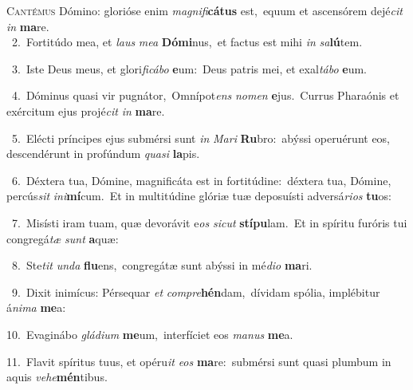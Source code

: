 \lettrine{\initial\textcolor{\initialcolor}{C}}{antémus} Dómino: glorióse enim \textit{ma}\-\textit{gni}\textit{fi}\textbf{cá}\textbf{tus} est,~\star equum et ascensórem dejé\textit{cit} \textit{in} \textbf{ma}\-re.\\
{\numbfont\textcolor{\numbcolor}{~2.}}~Fortitúdo mea, et \textit{laus} \textit{me}\-\textit{a} \textbf{Dó}\-\textbf{mi}nus,~\star et factus est mihi \textit{in} \textit{sa}\-\textbf{lú}tem.\par
{\numbfont\textcolor{\numbcolor}{~3.}}~Iste Deus meus, et glori\-\textit{fi}\-\textit{cá}\textit{bo} \textbf{e}\-um:~\star Deus patris mei, et exal\-\textit{tá}\-\textit{bo} \textbf{e}\-um.\par
{\numbfont\textcolor{\numbcolor}{~4.}}~Dóminus quasi vir pugnátor,~\dagger Omnípot\textit{ens} \textit{no}\-\textit{men} \textbf{e}\-jus.~\star Currus Pharaónis et exércitum ejus projé\textit{cit} \textit{in} \textbf{ma}\-re.\par
{\numbfont\textcolor{\numbcolor}{~5.}}~Elécti príncipes ejus submérsi sunt \textit{in} \textit{Ma}\-\textit{ri} \textbf{Ru}\-bro:~\star abýssi operuérunt eos, descendérunt in profúndum \textit{qua}\-\textit{si} \textbf{la}\-pis.\par
{\numbfont\textcolor{\numbcolor}{~6.}}~Déxtera tua, Dómine, magnificáta est in fortitúdine:~\dagger déxtera tua, Dómine, percús\textit{sit} \textit{in}\-\textit{i}\textbf{mí}cum.~\star Et in multitúdine glóriæ tuæ deposuísti adversá\-\textit{ri}\-\textit{os} \textbf{tu}\-os:\par
{\numbfont\textcolor{\numbcolor}{~7.}}~Misísti iram tuam, quæ devorávit e\textit{os} \textit{sic}\-\textit{ut} \textbf{stí}\-\textbf{pu}lam.~\star Et in spíritu furóris tui congregá\textit{tæ} \textit{sunt} \textbf{a}\-quæ:\par
{\numbfont\textcolor{\numbcolor}{~8.}}~Ste\textit{tit} \textit{un}\-\textit{da} \textbf{flu}\-ens,~\star congregátæ sunt abýssi in mé\-\textit{di}\-\textit{o} \textbf{ma}\-ri.\par
{\numbfont\textcolor{\numbcolor}{~9.}}~Dixit inimícus: Pérsequar \textit{et} \textit{com}\-\textit{pre}\textbf{hén}dam,~\star dívidam spólia, implébitur á\-\textit{ni}\-\textit{ma} \textbf{me}\-a:\par
{\numbfont\textcolor{\numbcolor}{10.}}~Evaginábo \textit{glá}\-\textit{di}\textit{um} \textbf{me}\-um,~\star interfíciet eos \textit{ma}\-\textit{nus} \textbf{me}\-a.\par
{\numbfont\textcolor{\numbcolor}{11.}}~Flavit spíritus tuus, et opéru\textit{it} \textit{e}\-\textit{os} \textbf{ma}\-re:~\star submérsi sunt quasi plumbum in aquis \textit{ve}\-\textit{he}\textbf{mén}tibus.\par
